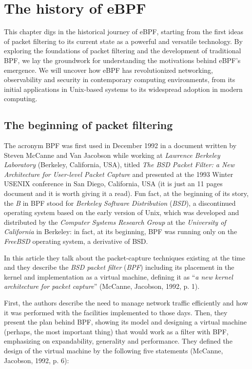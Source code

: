\chapter{The history of eBPF}

This chapter digs in the historical journey of eBPF, starting from the first ideas of packet filtering to its current state as a powerful and versatile technology. 
By exploring the foundations of packet filtering and the development of traditional BPF, we lay the groundwork for understanding the motivations behind eBPF's emergence. 
We will uncover how eBPF has revolutionized networking, observability and security in contemporary computing environments, from its initial applications in Unix-based systems to its widespread adoption in modern computing.

\section{The beginning of packet filtering}

The acronym BPF was first used in December 1992 in a document written by Steven McCanne and Van Jacobson while working at \textit{Lawrence Berkeley Laboratory} (Berkeley, California, USA), titled \textit{The BSD Packet Filter: a New Architecture for User-level Packet Capture} \cite{BSDPacketFilter} and presented at the 1993 Winter USENIX conference in San Diego, California, USA (it is just an 11 pages document and it is worth giving it a read).
Fun fact, at the beginning of its story, the \textit{B} in BPF stood for \textit{Berkeley Software Distribution} (\textit{BSD}), a discontinued operating system based on the early version of Unix, which was developed and distributed by the \textit{Computer Systems Research Group} at the \textit{University of California} in Berkeley: in fact, at its beginning, BPF was running only on the \textit{FreeBSD} operating system, a derivative of BSD.

In this article they talk about the packet-capture techniques existing at the time and they describe the \textit{BSD packet filter} (\textit{BPF}) including its placement in the kernel and implementation as a virtual machine, defining it as ``\textit{a new kernel architecture for packet capture}'' (McCanne, Jacobson, 1992, p. 1).

First, the authors describe the need to manage network traffic efficiently and how it was performed with the facilities implemented to those days.
Then, they present the plan behind BPF, showing its model and designing a virtual machine (perhaps, the most important thing) that would work as a filter with BPF, emphasizing on expandability, generality and performance.
They defined the design of the virtual machine by the following five statements (McCanne, Jacobson, 1992, p. 6):


